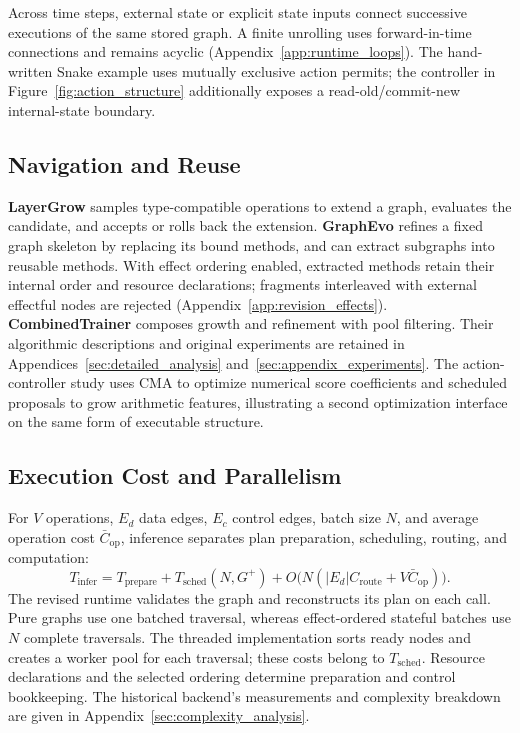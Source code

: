 Across time steps, external state or explicit state inputs connect successive executions of the same stored graph. A finite unrolling uses forward-in-time connections and remains acyclic (Appendix~\ref{app:runtime_loops}). The hand-written Snake example uses mutually exclusive action permits; the controller in Figure~\ref{fig:action_structure} additionally exposes a read-old/commit-new internal-state boundary.

\subsection{Navigation and Reuse}
\label{subsec:navigability_validation}
\textbf{LayerGrow} samples type-compatible operations to extend a graph, evaluates the candidate, and accepts or rolls back the extension. \textbf{GraphEvo} refines a fixed graph skeleton by replacing its bound methods, and can extract subgraphs into reusable methods. With effect ordering enabled, extracted methods retain their internal order and resource declarations; fragments interleaved with external effectful nodes are rejected (Appendix~\ref{app:revision_effects}). \textbf{CombinedTrainer} composes growth and refinement with pool filtering. Their algorithmic descriptions and original experiments are retained in Appendices~\ref{sec:detailed_analysis} and~\ref{sec:appendix_experiments}. The action-controller study uses CMA to optimize numerical score coefficients and scheduled proposals to grow arithmetic features, illustrating a second optimization interface on the same form of executable structure.

\subsection{Execution Cost and Parallelism}
\label{subsec:inference_complexity}
For $V$ operations, $E_d$ data edges, $E_c$ control edges, batch size $N$, and average operation cost $\bar C_{\mathrm{op}}$, inference separates plan preparation, scheduling, routing, and computation:
\begin{equation}
T_{\mathrm{infer}}=T_{\mathrm{prepare}}+T_{\mathrm{sched}}(N,G^+)
+O\bigl(N(|E_d|C_{\mathrm{route}}+V\bar C_{\mathrm{op}})\bigr).
\end{equation}
The revised runtime validates the graph and reconstructs its plan on each call. Pure graphs use one batched traversal, whereas effect-ordered stateful batches use $N$ complete traversals. The threaded implementation sorts ready nodes and creates a worker pool for each traversal; these costs belong to $T_{\mathrm{sched}}$. Resource declarations and the selected ordering determine preparation and control bookkeeping. The historical backend's measurements and complexity breakdown are given in Appendix~\ref{sec:complexity_analysis}.

